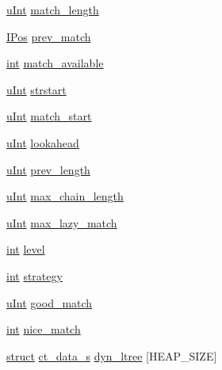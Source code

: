 \begin{DoxyCompactItemize}
\item 
\hyperlink{zconf_8h_a87d141052bcd5ec8a80812a565c70369}{u\-Int} \hyperlink{structinternal__state_aa1506e6907be6f3d4273a1386206ae0c}{match\-\_\-length}
\item 
\hyperlink{deflate_8h_ada696b787a46d01634b6365afcec1a9e}{I\-Pos} \hyperlink{structinternal__state_a0f5871de1be252ed0496a8b7a30464ef}{prev\-\_\-match}
\item 
\hyperlink{ioapi_8h_a787fa3cf048117ba7123753c1e74fcd6}{int} \hyperlink{structinternal__state_accddba15d8b54ca3f10163fa920599f4}{match\-\_\-available}
\item 
\hyperlink{zconf_8h_a87d141052bcd5ec8a80812a565c70369}{u\-Int} \hyperlink{structinternal__state_a946579b9b86ee466424ffb0a67eb7060}{strstart}
\item 
\hyperlink{zconf_8h_a87d141052bcd5ec8a80812a565c70369}{u\-Int} \hyperlink{structinternal__state_aced58a85c56daa1c5de41fa5ce75d2e8}{match\-\_\-start}
\item 
\hyperlink{zconf_8h_a87d141052bcd5ec8a80812a565c70369}{u\-Int} \hyperlink{structinternal__state_a3a826064126ee19a77f78919e2f9bb1e}{lookahead}
\item 
\hyperlink{zconf_8h_a87d141052bcd5ec8a80812a565c70369}{u\-Int} \hyperlink{structinternal__state_a7619fb70f9f66ff21b419b8ceac4904c}{prev\-\_\-length}
\item 
\hyperlink{zconf_8h_a87d141052bcd5ec8a80812a565c70369}{u\-Int} \hyperlink{structinternal__state_ab1ffa7feb159edec170574813fae3279}{max\-\_\-chain\-\_\-length}
\item 
\hyperlink{zconf_8h_a87d141052bcd5ec8a80812a565c70369}{u\-Int} \hyperlink{structinternal__state_ab74215ec1c106bf588a7642927d47b84}{max\-\_\-lazy\-\_\-match}
\item 
\hyperlink{ioapi_8h_a787fa3cf048117ba7123753c1e74fcd6}{int} \hyperlink{structinternal__state_a7ad2ab1df80c8cab4ffb97ff84e88c62}{level}
\item 
\hyperlink{ioapi_8h_a787fa3cf048117ba7123753c1e74fcd6}{int} \hyperlink{structinternal__state_a67219312df7fd2f86e06e6f14700eb28}{strategy}
\item 
\hyperlink{zconf_8h_a87d141052bcd5ec8a80812a565c70369}{u\-Int} \hyperlink{structinternal__state_a68ba00254242017f330dca5e0191bca4}{good\-\_\-match}
\item 
\hyperlink{ioapi_8h_a787fa3cf048117ba7123753c1e74fcd6}{int} \hyperlink{structinternal__state_a39ab99e52138c0628f645bc1e0c69a04}{nice\-\_\-match}
\item 
\hyperlink{sdlgamepad_8dox_aba655c5729da86df745f0c8e7f9ba8d2}{struct} \hyperlink{structct__data__s}{ct\-\_\-data\-\_\-s} \hyperlink{structinternal__state_ae11867c05d54c575dbc713bbea71266c}{dyn\-\_\-ltree} \mbox{[}H\-E\-A\-P\-\_\-\-S\-I\-Z\-E\mbox{]}

\end{DoxyCompactItemize}
